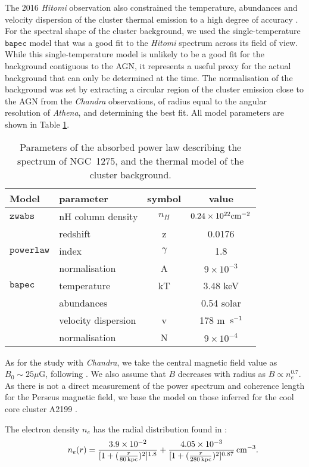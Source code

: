 \documentclass[fleqn,usenatbib,useAMS]{mnras}
\begin{document}
The 2016 {\it Hitomi} observation also constrained the temperature, abundances and velocity dispersion of the cluster thermal emission to a high degree of accuracy \cite{Aharonian:2016gzq}.
For the spectral shape of the cluster background, we used the single-temperature $\mathtt{bapec}$ model that was a good fit
to the {\it Hitomi} spectrum across its field of view. While this single-temperature model is unlikely to be a good fit for the background
contiguous to the AGN, it represents a useful proxy for the actual background that can only be determined at the time.
The normalisation of the background was set by extracting a circular region
of the cluster emission close to the AGN from the {\it Chandra} observations, of radius equal to the angular resolution of {\it Athena}, and determining the best fit. All model parameters are shown in Table \ref{parameters}.
\begin{table}
\centering
\begin{tabular}{l|l|c|c}
Model & parameter & symbol & value\\ \hline \hline
$\mathtt{zwabs}$ & nH column density & $n_H$ & $0.24 \times 10^{22} \rm{cm}^{-2}$\\
 & redshift & z & 0.0176\\ \hline
$\mathtt{powerlaw}$ & index & $\gamma$ & 1.8\\
 & normalisation & A & $9 \times 10^{-3}$\\ \hline
$\mathtt{bapec}$ & temperature & kT & 3.48 keV\\
 & abundances & & 0.54 solar\\
 & velocity dispersion & v & 178 m \,${\rm s}^{-1}$\\
& normalisation & N & $9 \times 10^{-4}$
\end{tabular}
\caption{Parameters of the absorbed power law describing the spectrum of NGC~1275, and the thermal model of the cluster background.}
\label{parameters}
\end{table}

As for the study with {\it Chandra}, we take the central magnetic field value as $B_0\sim 25\mu $G, following \cite{0602622}. We also
assume that $B$ decreases with radius as $B \propto n_{e}^{0.7}$.
As there is not a direct measurement of the power spectrum and coherence length for the Perseus magnetic field, we base the model on those inferred for the cool core cluster A2199 \cite{Vacca:2012up}.

The electron density $n_{e}$ has the radial distribution found in \cite{Churazov:2003hr}:
\begin{equation}
\qquad n_{e} (r) = \frac{3.9 \times 10^{-2}}{ [ 1 + (\frac{r}{80 \, {\rm kpc}})^2]^{1.8}} +  \frac{4.05 \times 10^{-3}}{ [ 1 + (\frac{r}{280 \, {\rm kpc}})^2]^{0.87}} \, {\rm cm}^{-3}.
\end{equation}
\end{document}
